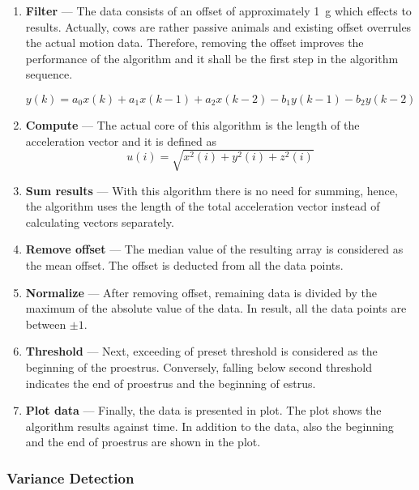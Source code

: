 \documentclass[english,12pt,a4paper,pdftex,elec,utf8]{aaltothesis}
\begin{document}
\begin{enumerate}
\item \textbf{Filter} --- The data consists of an offset of approximately \SI{1}{\gram} which effects to results. Actually, cows are rather passive animals and existing offset overrules the actual motion data. Therefore, removing the offset improves the performance of the algorithm and it shall be the first step in the algorithm sequence.

\begin{equation}
y(k) = a_0 x(k) + a_1 x(k-1) + a_2 x(k-2) - b_1 y(k-1) - b_2 y(k-2)
\end{equation}

\item \textbf{Compute} --- The actual core of this algorithm is the length of the acceleration vector and it is defined as \begin{equation}
u(i) = \sqrt{x^2(i) + y^2(i) + z^2(i)} 
\end{equation}

\item \textbf{Sum results} --- With this algorithm there is no need for summing, hence, the algorithm uses the length of the total acceleration vector instead of calculating vectors separately.

\item \textbf{Remove offset} --- The median value of the resulting array is considered as the mean offset. The offset is deducted from all the data points.

\item \textbf{Normalize} --- After removing offset, remaining data is divided by the maximum of the absolute value of the data. In result, all the data points are between $\pm 1$.

\item \textbf{Threshold} --- Next, exceeding of preset threshold is considered as the beginning of the proestrus. Conversely, falling below second threshold indicates the end of proestrus and the beginning of estrus.

\item \textbf{Plot data} --- Finally, the data is presented in plot. The plot shows the algorithm results against time. In addition to the data, also the beginning and the end of proestrus are shown in the plot.

\end{enumerate}


\subsubsection{Variance Detection} \label{variancedetectionsection}
\end{document}

